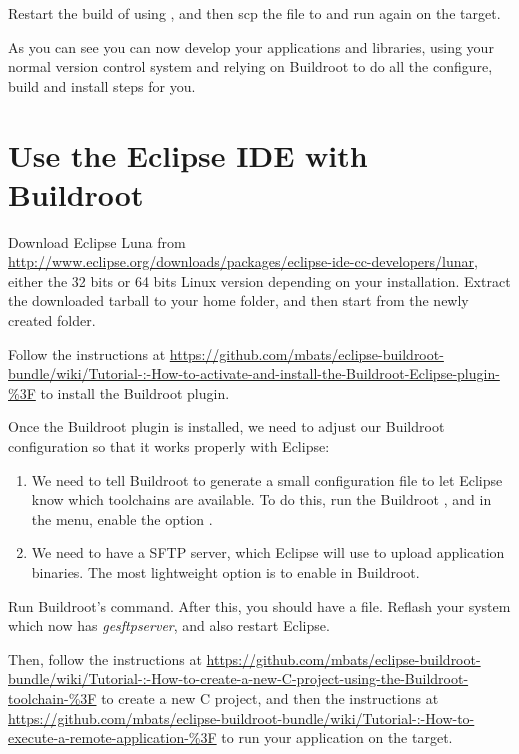 Restart the build of  using , and
then scp the file  to
 and run  again on the target.

As you can see you can now develop your applications and libraries,
using your normal version control system and relying on Buildroot to
do all the configure, build and install steps for you.

\section{Use the Eclipse IDE with Buildroot}

Download Eclipse Luna from
\url{http://www.eclipse.org/downloads/packages/eclipse-ide-cc-developers/lunar},
either the 32 bits or 64 bits Linux version depending on your
installation. Extract the downloaded tarball to your home folder, and
then start  from the newly created 
folder.

Follow the instructions at
\url{https://github.com/mbats/eclipse-buildroot-bundle/wiki/Tutorial-:-How-to-activate-and-install-the-Buildroot-Eclipse-plugin-%3F}
to install the Buildroot plugin.

Once the Buildroot plugin is installed, we need to adjust our Buildroot configuration so that it works properly with Eclipse:

\begin{enumerate}

\item We need to tell Buildroot to generate a small configuration file
  to let Eclipse know which toolchains are available. To do this, run
  the Buildroot , and in the  menu,
  enable the option .

\item We need to have a SFTP server, which Eclipse will use to upload
  application binaries. The most lightweight option is to enable
   in Buildroot.

\end{enumerate}

Run Buildroot's  command. After this, you should have a
 file. Reflash your system
which now has {\em gesftpserver}, and also restart Eclipse.

Then, follow the instructions at
\url{https://github.com/mbats/eclipse-buildroot-bundle/wiki/Tutorial-:-How-to-create-a-new-C-project-using-the-Buildroot-toolchain-%3F}
to create a new C project, and then the instructions at
\url{https://github.com/mbats/eclipse-buildroot-bundle/wiki/Tutorial-:-How-to-execute-a-remote-application-%3F}
to run your application on the target.
